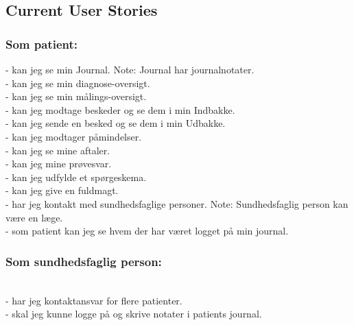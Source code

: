 %
%
%
%
%
%
\subsection{Current User Stories} %
\subsubsection{Som patient:}
- kan jeg se min Journal. Note: Journal har journalnotater. \\
- kan jeg se min diagnose-oversigt.\\
- kan jeg se min målings-oversigt.\\
- kan jeg modtage beskeder og se dem i min Indbakke.\\
- kan jeg sende en besked og se dem i min Udbakke.\\
- kan jeg modtager påmindelser.\\
- kan jeg se mine aftaler. \\
- kan jeg mine prøvesvar.\\
- kan jeg udfylde et spørgeskema.\\
- kan jeg give en fuldmagt. \\
- har jeg kontakt med sundhedsfaglige personer. Note: Sundhedsfaglig person kan være en læge. \\
- som patient kan jeg se hvem der har været logget på min journal.
\subsubsection{Som sundhedsfaglig person:}\\
- har jeg kontaktansvar for flere patienter.\\
- skal jeg kunne logge på og skrive notater i patients journal.\\
\newline

